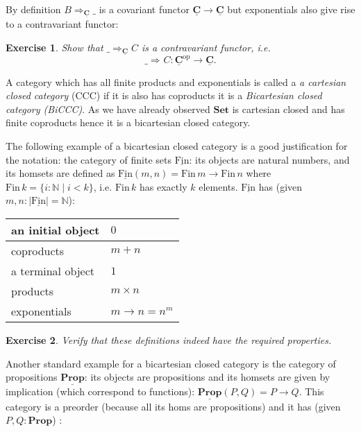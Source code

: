 \documentclass{article}
\newcommand{\Prop}{\mathbf{Prop}}
\newcommand{\Set}{\mathbf{Set}}
\newcommand{\cat}[1]{\underline{\mathbf{#1}}}
\newcommand{\obj}[1]{|#1|}
\newcommand{\op}{\mathrm{op}}
\newcommand{\Nat}{\mathbb{N}}
\newcommand{\Fin}{\mathrm{Fin}}
\newcommand{\expC}[3]{#2\Rightarrow_{#1} #3}
\newcommand{\expX}[2]{\expC{}{#1}{#2}}
\newtheorem{exercise}{Exercise}
\begin{document}
By definition $\expC{\cat{C}}{B}{\_}$ is a covariant functor $\cat{C} \to \cat{C}$ but exponentials also give rise to a contravariant functor:
\begin{exercise}
Show that $\expC{\cat{C}}{\_}{C}$ is a contravariant functor, i.e. 
\[\expC{}{\_}{C} : \cat{C}^\op \to \cat{C}.\]     
\end{exercise}

A category which has all finite products and exponentials is called a \emph{a cartesian closed category} (CCC) if it is also has coproducts it is a \emph{Bicartesian closed category (BiCCC)}. As we have already observed $\Set$ is cartesian closed and has finite coproducts hence it is a bicartesian closed category. 

The following example of a bicartesian closed category is a good justification for the notation: the category of finite sets $\cat{\Fin}$: its objects are natural numbers, and its homsets are defined as $\cat{\Fin}(m,n) = \Fin\, m \to \Fin\,n$ where $\Fin\,k = \{ i : \Nat \mid i < k\}$, i.e. $\Fin\,k$ has exactly $k$ elements. $\cat{\Fin}$ has (given $m,n : \obj{\cat{\Fin}}=\Nat$):

\begin{tabular}{|l|l|}
\hline
an initial object & $0$ \\ \hline
coproducts & $m + n$ \\ \hline
a terminal object & $1$ \\\hline
products & $m\times n$ \\\hline
exponentials & $m \to n = n^m$\\\hline
\end{tabular}


\begin{exercise}
Verify that these definitions indeed have the required properties.
\end{exercise}

Another standard example for a bicartesian closed category is the category of propositions $\cat{\Prop}$: its objects are propositions and its homsets are given by implication (which correspond to functions): $\cat{\Prop}(P,Q) = P \to Q$. This category is a preorder (because all its homs are propositions) and it has (given $P,Q : \Prop$) :
\end{document}
